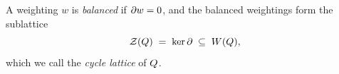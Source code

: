 \begin{definition}\label{sh-0004}
A weighting $w$ is \emph{balanced} if $\partial w = 0$, and the balanced weightings form the sublattice
\begin{equation}\label{eq:cycle-lattice}
\mathcal{Z}(Q) \;=\; \ker \partial \;\subseteq\; W(Q),
\end{equation}
which we call the \emph{cycle lattice} of $Q$.
\end{definition}